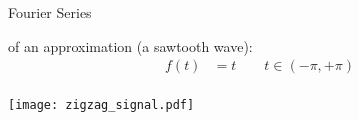 \begin{frame}[t]{Fourier Series}

    \myExample of an approximation (a sawtooth wave):
    {\scriptsize
    \begin{align*}
        f(t) & = t \quad\quad t \in \left(-\pi,+\pi\right) \\
    \end{align*}}%

    \vspace{-0.5cm}
    \begin{center}
        \texttt{[image: zigzag\_signal.pdf]}
    \end{center}
\end{frame}

